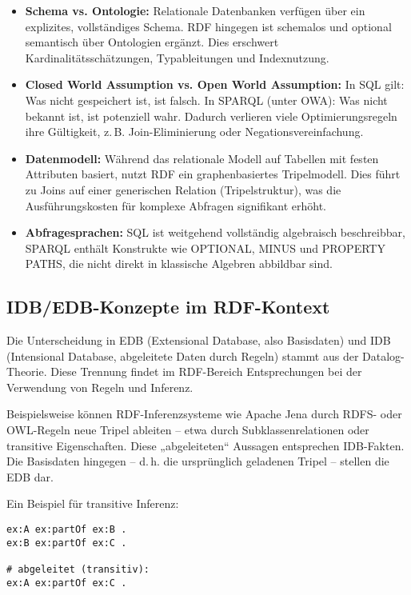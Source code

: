 \documentclass[12pt]{article}
\begin{document}
\begin{itemize}
    \item \textbf{Schema vs. Ontologie:} Relationale Datenbanken verfügen über ein explizites, vollständiges Schema. RDF hingegen ist schemalos und optional semantisch über Ontologien ergänzt. Dies erschwert Kardinalitätsschätzungen, Typableitungen und Indexnutzung.
    
    \item \textbf{Closed World Assumption vs. Open World Assumption:} In SQL gilt: Was nicht gespeichert ist, ist falsch. In SPARQL (unter OWA): Was nicht bekannt ist, ist potenziell wahr. Dadurch verlieren viele Optimierungsregeln ihre Gültigkeit, z.\,B. Join-Eliminierung oder Negationsvereinfachung.
    
    \item \textbf{Datenmodell:} Während das relationale Modell auf Tabellen mit festen Attributen basiert, nutzt RDF ein graphenbasiertes Tripelmodell. Dies führt zu Joins auf einer generischen Relation (Tripelstruktur), was die Ausführungskosten für komplexe Abfragen signifikant erhöht.
    
    \item \textbf{Abfragesprachen:} SQL ist weitgehend vollständig algebraisch beschreibbar, SPARQL enthält Konstrukte wie OPTIONAL, MINUS und PROPERTY PATHS, die nicht direkt in klassische Algebren abbildbar sind.
\end{itemize}

\subsection{IDB/EDB-Konzepte im RDF-Kontext}

Die Unterscheidung in EDB (Extensional Database, also Basisdaten) und IDB (Intensional Database, abgeleitete Daten durch Regeln) stammt aus der Datalog-Theorie. Diese Trennung findet im RDF-Bereich Entsprechungen bei der Verwendung von Regeln und Inferenz.

Beispielsweise können RDF-Inferenzsysteme wie Apache Jena durch RDFS- oder OWL-Regeln neue Tripel ableiten – etwa durch Subklassenrelationen oder transitive Eigenschaften. Diese „abgeleiteten“ Aussagen entsprechen IDB-Fakten. Die Basisdaten hingegen – d.\,h. die ursprünglich geladenen Tripel – stellen die EDB dar.

Ein Beispiel für transitive Inferenz:

\begin{lstlisting}[caption=Beispiel für abgeleitete Tripel durch Inferenz]
ex:A ex:partOf ex:B .
ex:B ex:partOf ex:C .

# abgeleitet (transitiv):
ex:A ex:partOf ex:C .
\end{lstlisting}
\end{document}
